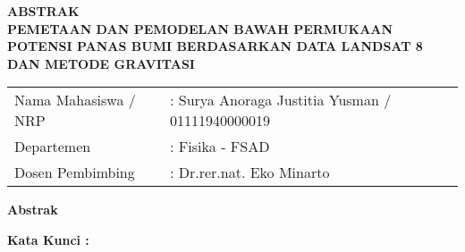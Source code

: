 \newpage
\thispagestyle{empty}

\begin{center}
	\textbf{ABSTRAK}\\
	\vskip 20pt
	\textbf{PEMETAAN DAN PEMODELAN BAWAH PERMUKAAN POTENSI PANAS BUMI BERDASARKAN DATA LANDSAT 8 DAN METODE GRAVITASI}
	\vskip 20pt
\end{center}

\begin{table}[h]
	\begin{tabular}{ll}
		Nama Mahasiswa / NRP &: Surya Anoraga Justitia Yusman / 01111940000019\\
		Departemen &: Fisika - FSAD\\
		Dosen Pembimbing &: Dr.rer.nat. Eko Minarto
	\end{tabular}
\end{table}

\vskip 10pt
\textbf{Abstrak}
\vskip 5pt
\hspace{25pt} 

\vskip 10pt
\textbf{Kata Kunci :} 

\restoregeometry
